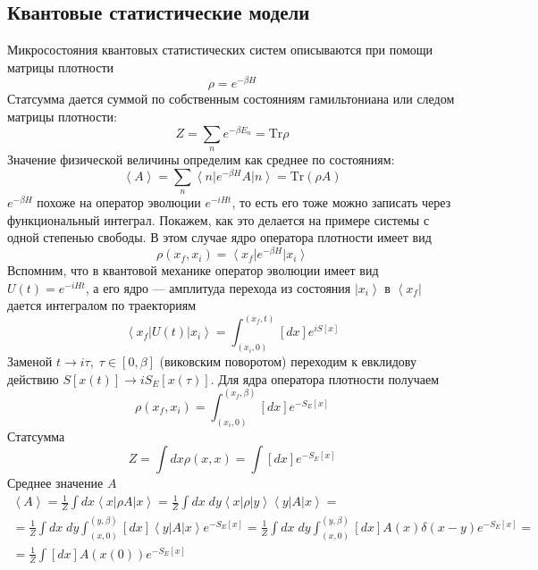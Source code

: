 \documentclass[a4paper,12pt]{article}
\theoremstyle{definition}
\theoremstyle{definition}
\theoremstyle{definition}
\begin{document}
\subsection*{Квантовые статистические модели}
\label{sec:quantum-statistical-models}

Микросостояния квантовых статистических систем описываются при помощи матрицы плотности
\begin{equation}
  \label{eq:19}
  \rho=e^{-\beta H}
\end{equation}
Статсумма дается суммой по собственным состояниям гамильтониана или следом матрицы плотности:
\begin{equation}
  \label{eq:20}
  Z=\sum_n e^{-\beta E_n}=\mathrm{Tr} \rho
\end{equation}
Значение физической величины определим как среднее по состояниям:
\begin{equation}
  \label{eq:21}
  \left< A\right>=\sum_n \left< n\right| e^{-\beta H}A\left| n \right>=\mathrm{Tr}(\rho A)
\end{equation}
$e^{-\beta H}$ похоже на оператор эволюции $e^{-i H t}$, то есть его тоже можно записать через
функциональный интеграл. Покажем, как это делается на примере системы с одной степенью свободы. В
этом случае ядро оператора плотности имеет вид 
\begin{equation}
  \label{eq:22}
  \rho(x_f,x_i)=\left<x_f\right|e^{-\beta H} \left|x_i\right>
\end{equation}
Вспомним, что в квантовой механике оператор эволюции имеет вид $U(t)=e^{-i H t}$, а его ядро ---
амплитуда перехода из состояния $\left|x_i\right>$ в $\left<x_f\right|$ дается интегралом по
траекториям 
\begin{equation}
  \label{eq:23}
  \left<x_f\right| U(t)\left| x_i\right>=\int_{(x_i,0)}^{(x_f,t)} [dx] e^{i S[x]}
\end{equation}
Заменой $t\to i\tau, \; \tau\in [0,\beta]$ (виковским поворотом) переходим к евклидову действию
$S[x(t)]\to iS_E[x(\tau)]$. Для ядра оператора плотности получаем 
\begin{equation}
  \label{eq:24}
  \rho(x_f,x_i)=\int_{(x_i,0)}^{(x_f,\beta)} [dx] e^{-S_E[x]}
\end{equation}
Статсумма
\begin{equation}
  \label{eq:25}
  Z=\int dx \rho(x,x)=\int [dx] e^{-S_E[x]}
\end{equation}
Среднее значение $A$
\begin{equation}
  \label{eq:26}
  \begin{array}{l}
    \left<A\right>=\frac{1}{Z}\int dx \left<x\right|\rho A\left|x\right>=\frac{1}{Z}\int dx\; dy \left<x\right|\rho\left|y\right>\left<y\right|A\left|x\right>=    \\
    =\frac{1}{Z}\int dx\; dy \int_{(x,0)}^{(y,\beta)} [dx] \left<y\right| A\left| x\right> e^{-S_E[x]}=\frac{1}{Z}\int dx\; dy\int_{(x,0)}^{(y,\beta)} [dx] A(x) \delta(x-y) e^{-S_E[x]}=\\
    =\frac{1}{Z}\int [dx] A(x(0))e^{-S_E[x]}
  \end{array}
\end{equation}
\end{document}
